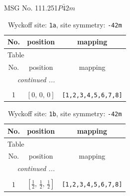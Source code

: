 \documentclass[fleqn,8pt]{jsarticle}
\begin{document}
\setcounter{MaxMatrixCols}{32}

\renewcommand{\tablename}{Table~}
\renewcommand{\figurename}{Figure~}
\begin{center}
\LARGE
MSG No. 111.251\quad$P\bar{4}2m$
\end{center}
\renewcommand{\arraystretch}{1.2}
\begin{longtable}{ccc}
\caption{Wyckoff site: {\tt 1a}, site symmetry: {\tt -42m}}
 \\
 \hline \hline
No. & position & mapping \\ \hline \endfirsthead

\multicolumn{2}{l}{\tablename\ \thetable{}} \\
 \hline \hline
No. & position & mapping \\ \hline \endhead

 \hline \hline
\multicolumn{2}{r}{\footnotesize\it continued ...} \\ \endfoot

 \hline \hline
\multicolumn{2}{r}{} \\ \endlastfoot

1 & $\left[ 0,\, 0,\, 0 \right]$ & {\tt [1,2,3,4,5,6,7,8]} \\
\end{longtable}
\renewcommand{\arraystretch}{1.2}
\begin{longtable}{ccc}
\caption{Wyckoff site: {\tt 1b}, site symmetry: {\tt -42m}}
 \\
 \hline \hline
No. & position & mapping \\ \hline \endfirsthead

\multicolumn{2}{l}{\tablename\ \thetable{}} \\
 \hline \hline
No. & position & mapping \\ \hline \endhead

 \hline \hline
\multicolumn{2}{r}{\footnotesize\it continued ...} \\ \endfoot

 \hline \hline
\multicolumn{2}{r}{} \\ \endlastfoot

1 & $\left[ \frac{1}{2},\, \frac{1}{2},\, \frac{1}{2} \right]$ & {\tt [1,2,3,4,5,6,7,8]} \\
\end{longtable}
\renewcommand{\arraystretch}{1.2}
\end{document}
